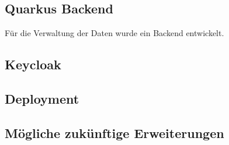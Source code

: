 \newpage

\subsection{Quarkus Backend}

Für die Verwaltung der Daten wurde ein Backend entwickelt.


\subsection{Keycloak}

\subsection{Deployment}

\subsection{Mögliche zukünftige Erweiterungen}


